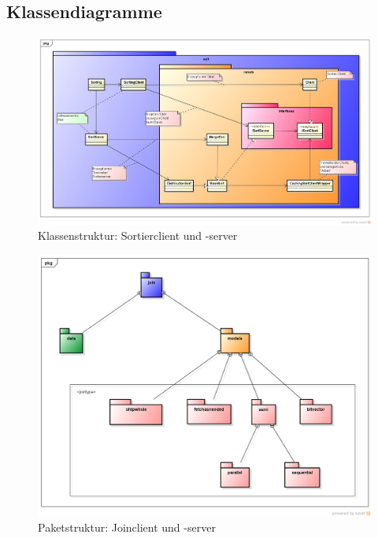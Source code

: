 \documentclass[fontsize=12pt,a4paper,headinclude=no,headings=small]{scrartcl}
\begin{document}
\begin{appendix}
\section{Klassendiagramme}
\begin{figure}[H]
	\centering
 	\includegraphics[width=\textwidth]{class-diagrams/sort.png}
	\caption{Klassenstruktur: Sortierclient und -server}
\end{figure}

\begin{figure}[H]
	\centering
 	\includegraphics[width=\textwidth]{class-diagrams/join-packages.png}
	\caption{Paketstruktur: Joinclient und -server}
\end{figure}


\end{appendix}
\end{document}
